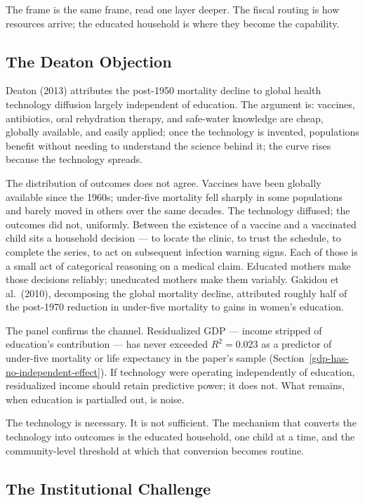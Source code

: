 \documentclass[12pt,letterpaper]{article}
\begin{document}
{The frame is the same frame, read one layer deeper. The fiscal routing is how resources arrive; the educated household is where they become the capability.

\subsection{The Deaton Objection}\label{the-deaton-objection}

Deaton (2013) attributes the post-1950 mortality decline to global health technology diffusion largely independent of education. The argument is: vaccines, antibiotics, oral rehydration therapy, and safe-water knowledge are cheap, globally available, and easily applied; once the technology is invented, populations benefit without needing to understand the science behind it; the curve rises because the technology spreads.

The distribution of outcomes does not agree. Vaccines have been globally available since the 1960s; under-five mortality fell sharply in some populations and barely moved in others over the same decades. The technology diffused; the outcomes did not, uniformly. Between the existence of a vaccine and a vaccinated child sits a household decision --- to locate the clinic, to trust the schedule, to complete the series, to act on subsequent infection warning signs. Each of those is a small act of categorical reasoning on a medical claim. Educated mothers make those decisions reliably; uneducated mothers make them variably. Gakidou et al.\ (2010), decomposing the global mortality decline, attributed roughly half of the post-1970 reduction in under-five mortality to gains in women's education.

The panel confirms the channel. Residualized GDP --- income stripped of education's contribution --- has never exceeded $R^2 = 0.023$ as a predictor of under-five mortality or life expectancy in the paper's sample (Section~\ref{gdp-has-no-independent-effect}). If technology were operating independently of education, residualized income should retain predictive power; it does not. What remains, when education is partialled out, is noise.

The technology is necessary. It is not sufficient. The mechanism that converts the technology into outcomes is the educated household, one child at a time, and the community-level threshold at which that conversion becomes routine.

\subsection{The Institutional Challenge}\label{the-institutional-challenge}

}
\end{document}
